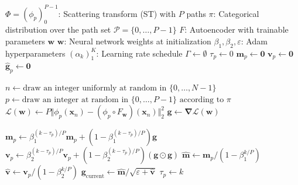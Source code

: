 \documentclass{article} %
\theoremstyle{plain}
\theoremstyle{definition}
\theoremstyle{remark}
\begin{document}
\begin{algorithm}[t]
\caption{
``\textbf{Sc}attering transform with \textbf{Ra}ndom \textbf{P}aths for machine \textbf{L}earning'' (SCRAPL).
The pseudo-code below describes SCRAPL with a batch size equal to one, without loss of generality.
}
\label{alg:scrapl}
\begin{algorithmic}
\REQUIRE $\Phi=(\phi_p)_{0}^{P-1}$: Scattering transform (ST) with $P$ paths
\REQUIRE $\pi$: Categorical distribution over the path set $\mathcal{P}=\{0,\ldots,P-1\}$
\REQUIRE $F$: Autoencoder with trainable parameters $\boldsymbol{w}$  
\REQUIRE $\boldsymbol{w}$: Neural network weights at initialization
\REQUIRE $\beta_1, \beta_2,\varepsilon$: Adam hyperparameters  
\REQUIRE $(\alpha_k)_1^{K}$: Learning rate schedule
\STATE $\Gamma \leftarrow \emptyset$
  \STATE $\tau_p \leftarrow 0$
  \STATE $\boldsymbol{m}_p \leftarrow \boldsymbol{0}$ %
  \STATE $\boldsymbol{v}_p \leftarrow \boldsymbol{0}$ %
  \STATE $\boldsymbol{\hat{g}}_p \leftarrow \boldsymbol{0}$ %
\ENDFOR
{}
    \colorbox{red!10}{
    \begin{minipage}{0.7128\linewidth}
    \STATE $n \leftarrow \textrm{draw an integer uniformly at random in }\{0,\ldots,N-1\}$
    \STATE $p \leftarrow \textrm{draw an integer at random in }\{0,\ldots,P-1\}\textrm{ according to }\pi$ 
    \STATE $\mathcal{L}(\boldsymbol{w}) \leftarrow P \big\Vert \phi_p(\boldsymbol{x}_n) - (\phi_p \circ F_{\boldsymbol{w}})(\boldsymbol{x}_n)\big\Vert_2^2$
    \STATE $\boldsymbol{g} \leftarrow \boldsymbol{\nabla}\mathcal{L}(\boldsymbol{w})$
    \end{minipage}
    }
    \colorbox{blue!10}{
    \begin{minipage}{0.806\linewidth}
    \STATE $\boldsymbol{m}_p \leftarrow \beta_1^{(k-\tau_p)/P} \boldsymbol{m}_p + (1 - \beta_{1}^{(k-\tau_p)/P}) \boldsymbol{g}$
    \STATE $\boldsymbol{v}_p \leftarrow \beta_2^{(k-\tau_p)/P} \boldsymbol{v}_p + (1 - \beta_{2}^{(k-\tau_p)/P}) (\boldsymbol{g} \odot \boldsymbol{g})$
    \STATE $\boldsymbol{\hat{m}} \leftarrow \boldsymbol{m}_p / (1 - \beta_1^{k/P})$
    \STATE $\boldsymbol{\hat{v}} \leftarrow \boldsymbol{v}_p / (1 - \beta_2^{k/P})$
    \STATE $\boldsymbol{g}_{\mathrm{current}} \leftarrow \boldsymbol{\hat{m}} / \sqrt{\varepsilon+ \boldsymbol{\hat{v}}}$
    \STATE $\tau_{p} \leftarrow k$
    \end{minipage}
    }


\end{algorithmic}
\end{algorithm}
\end{document}
